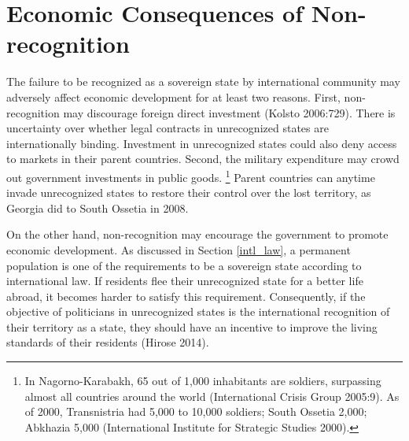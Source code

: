 \documentclass[12pt,a4paper]{article}%
\begin{document}

\section{Economic Consequences of Non-recognition}
The failure to be recognized as a sovereign state by international community may adversely affect economic development for at least two reasons.
First, non-recognition may discourage foreign direct investment (Kolsto 2006:729). 
There is uncertainty over whether legal contracts in unrecognized states are internationally binding. 
Investment in unrecognized states could also deny access to markets in their parent countries.
Second, the military expenditure may crowd out government investments in public goods.%
\footnote{
	In Nagorno-Karabakh, 65 out of 1,000 inhabitants are soldiers, surpassing almost all countries around the world (International Crisis Group 2005:9). 
	As of 2000, Transnistria had 5,000 to 10,000 soldiers; South Ossetia 2,000; Abkhazia 5,000 (International Institute for Strategic Studies 2000).
}
Parent countries can anytime invade unrecognized states to restore their control over the lost territory, as Georgia did to South Ossetia in 2008.

On the other hand, non-recognition may encourage the government to promote economic development. 
As discussed in Section \ref{intl_law}, a permanent population is one of the requirements to be a sovereign state according to international law.
If residents flee their unrecognized state for a better life abroad, it becomes harder to satisfy this requirement.
Consequently, if the objective of politicians in unrecognized states is the international recognition of their territory as a state, they should have an incentive to improve the living standards of their residents (Hirose 2014). 
\end{document}

